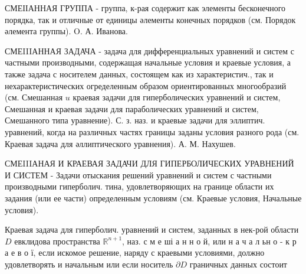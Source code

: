 \documentclass[10pt]{article}
\begin{document}
СМЕІІАННАЯ ГРУППА - группа, к-рая содержит как элементы бесконечного порядка, так и отличные от единицы әлементы конечных порядков (см. Порядок әлемента группы). O. А. Иванова.



СМЕIIIАННАЯ ЗАДАЧА - задача для дифференциальных уравнений и систем с частными производными, содержащая начальные условия и краевые условия, а также задача с носителем данных, состоящем как из характеристич., так и нехарактеристических огределенным образом ориентированных многообразий (см. Смешанная $u$ краевая задачи для гиперболических уравнений и систем, Смешанная и краевая задачи для параболических уравнений и систем, Смешанного типа уравнение). С. з. наз. и краевые задачи для эллиптич. уравнений, когда на различных частях границы заданы условия разного рода (см. Краевая задача для әллиптического уравнения). А. М. Нахушев.



СМЕIIIАНАЯ И КРАЕВАЯ ЗАДАЧИ ДЛЯ ГИПЕРБОЛИЧЕСКИХ УРАВНЕНИЙ И СИСТЕМ - Задачи отыскания решений уравнений и систем с частными производными гиперболич. тина, удовлетворяющих на границе области их задания (или ее части) определенным условиям (см. Краевые условия, Начальные условия).



Краевая задача для гиперболич. уравнений и систем, заданных в нек-рой области $D$ евклидова пространства $\mathbb{R}^{n+1}$, наз. с м е ші а н н о й, или н а ч а л ьн о - к р а е в о ї, если искомое решение, наряду с краевыми условиями, должно удовлетворять и начальным или если носитель $\partial D$ граничных данных состоит
\end{document}
